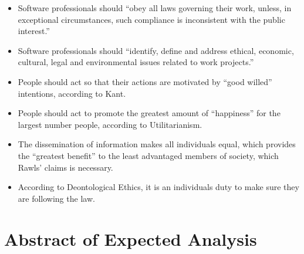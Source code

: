 \documentclass[11pt]{article}
\begin{document}
\begin{itemize}
\item Software professionals should ``obey all laws governing their work, unless, in exceptional circumstances, such compliance is inconsistent with the public interest.'' \cite[6.06]{secode}
\item Software professionals should ``identify, define and address ethical, economic, cultural, legal and environmental issues related to work projects.'' \cite[3.03]{secode}
\item People should act so that their actions are motivated by ``good willed'' intentions, according to Kant. \cite{kant}
\item People should act to promote the greatest amount of ``happiness'' for the largest number people, according to Utilitarianism. \cite{util}
\item The dissemination of information makes all individuals equal, which provides the ``greatest benefit'' to the least advantaged members of society, which Rawls' claims is necessary. \cite{rawls}
\item According to Deontological Ethics, it is an individuals duty to make sure they are following the law. \cite{deont}
\end{itemize}

\section{Abstract of Expected Analysis}


\end{document}
